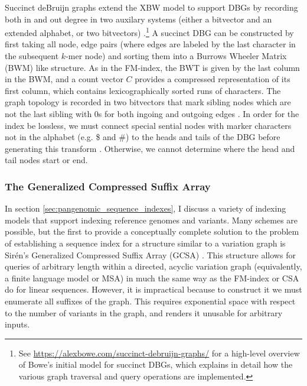 Succinct deBruijn graphs extend the XBW model to support DBGs by recording both in and out degree in two auxilary systems (either a bitvector and an extended alphabet, or two bitvectors) \cite{bowe2012succinct}.\footnote{See \url{https://alexbowe.com/succinct-debruijn-graphs/} for a high-level overview of Bowe's initial model for succinct DBGs, which explains in detail how the various graph traversal and query operations are implemented.}
A succinct DBG can be constructed by first taking all node, edge pairs (where edges are labeled by the last character in the subsequent $k$-mer node) and sorting them into a Burrows Wheeler Matrix (BWM) like structure.
As in the FM-index, the BWT is given by the last column in the BWM, and a count vector $C$ provides a compressed representation of its first column, which contains lexicographically sorted runs of characters.
The graph topology is recorded in two bitvectors that mark sibling nodes which are not the last sibling with 0s for both ingoing and outgoing edges \cite{muggli2017succinct}.
In order for the index be lossless, we must connect special sential nodes with marker characters not in the alphabet (e.g. \$ and \#) to the heads and tails of the DBG before generating this transform \cite{muggli2017succinct}.
Otherwise, we cannot determine where the head and tail nodes start or end.


\subsubsection{The Generalized Compressed Suffix Array}

In section \ref{sec:pangenomic_sequence_indexes}, I discuss a variety of indexing models that support indexing reference genomes and variants.
Many schemes are possible, but the first to provide a conceptually complete solution to the problem of establishing a sequence index for a structure similar to a variation graph is Sir\'{e}n's Generalized Compressed Suffix Array (GCSA) \cite{siren2014indexing}.
This structure allows for queries of arbitrary length within a directed, acyclic variation graph (equivalently, a finite language model or MSA) in much the same way as the FM-index or CSA do for linear sequences.
However, it is impractical because to construct it we must enumerate all suffixes of the graph.
This requires exponential space with respect to the number of variants in the graph, and renders it unusable for arbitrary inputs.

